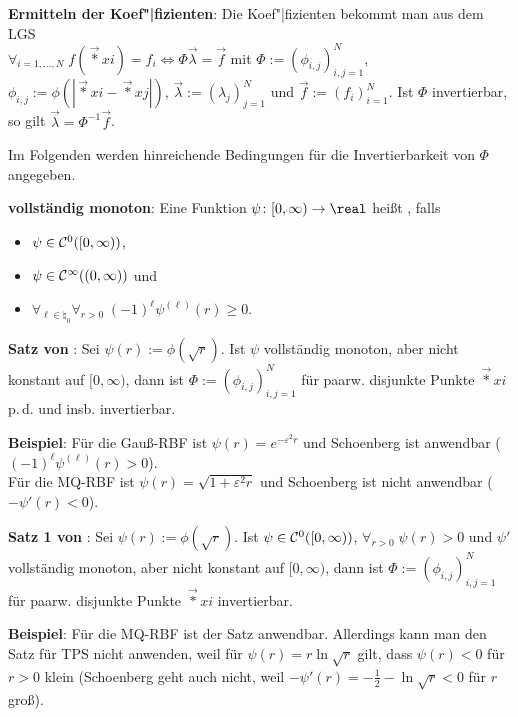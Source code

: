 \textbf{Ermitteln der Koef"|fizienten}:
Die Koef"|fizienten bekommt man aus dem LGS\\
$\forall_{i=1,\dotsc,N}\; f(\vec*{x}{i}) = f_i
\iff \Phi\vec{\lambda} = \vec{f}$
mit $\Phi := (\phi_{i,j})_{i,j=1}^N$, $\phi_{i,j} := \phi(|\vec*{x}{i} - \vec*{x}{j}|)$,
$\vec{\lambda} := (\lambda_j)_{j=1}^N$ und $\vec{f} := (f_i)_{i=1}^N$.
Ist $\Phi$ invertierbar, so gilt $\vec{\lambda} = \Phi^{-1} \vec{f}$.

\linie

Im Folgenden werden hinreichende Bedingungen für die Invertierbarkeit von $\Phi$
angegeben.

\textbf{vollständig monoton}:
Eine Funktion $\psi\colon [0, \infty) \to \real$ heißt , falls
\begin{itemize}
    \item
    $\psi \in \mathcal{C}^0([0, \infty))$,

    \item
    $\psi \in \mathcal{C}^\infty((0, \infty))$ und

    \item
    $\forall_{\ell \in \natural_0} \forall_{r > 0}\; (-1)^\ell \psi^{(\ell)}(r) \ge 0$.
\end{itemize}

\textbf{Satz von }:
Sei $\psi(r) := \phi(\sqrt{r})$.
Ist $\psi$ vollständig monoton, aber nicht konstant auf $[0, \infty)$,
dann ist $\Phi := (\phi_{i,j})_{i,j=1}^N$ für paarw. disjunkte Punkte
$\vec*{x}{i}$ p.\,d. und insb. invertierbar.

\textbf{Beispiel}:
Für die Gauß-RBF ist $\psi(r) = e^{-\varepsilon^2 r}$
und Schoenberg ist anwendbar
($(-1)^\ell \psi^{(\ell)}(r) > 0$).\\
Für die MQ-RBF ist $\psi(r) = \sqrt{1 + \varepsilon^2 r}$
und Schoenberg ist nicht anwendbar
($-\psi'(r) < 0$).

\linie

\textbf{Satz 1 von }:
Sei $\psi(r) := \phi(\sqrt{r})$.
Ist $\psi \in \mathcal{C}^0([0, \infty))$,
$\forall_{r>0}\; \psi(r) > 0$ und
$\psi'$ vollständig monoton, aber nicht konstant auf $[0, \infty)$,
dann ist $\Phi := (\phi_{i,j})_{i,j=1}^N$ für paarw. disjunkte Punkte
$\vec*{x}{i}$ invertierbar.

\textbf{Beispiel}:
Für die MQ-RBF ist der Satz anwendbar.
Allerdings kann man den Satz für TPS nicht anwenden,
weil für $\psi(r) = r \ln\sqrt{r}$ gilt,
dass $\psi(r) < 0$ für $r > 0$ klein
(Schoenberg geht auch nicht, weil $-\psi'(r) = -\frac{1}{2} - \ln\sqrt{r} < 0$
für $r$ groß).

